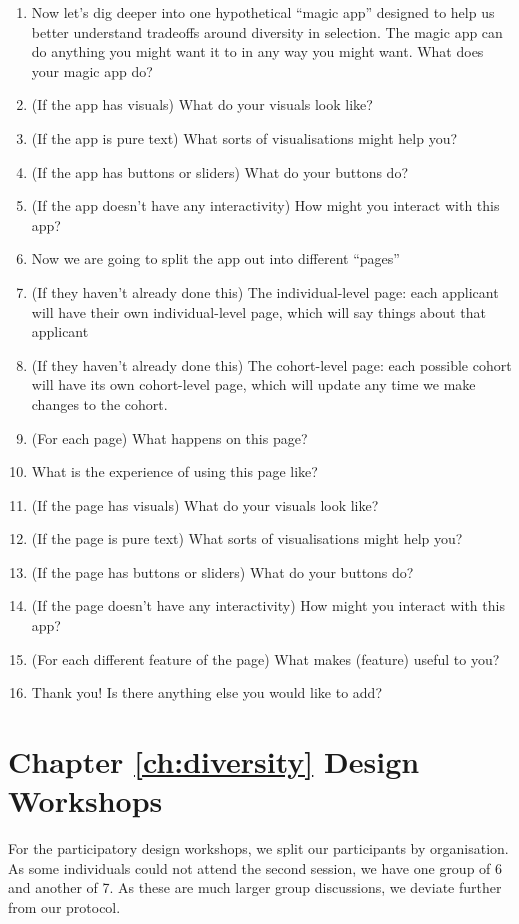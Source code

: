 \begin{enumerate}
    \item Now let's dig deeper into one hypothetical ``magic app'' designed to help us better understand tradeoffs around diversity in selection. The magic app can do anything you might want it to in any way you might want. What does your magic app do?
    \item (If the app has visuals) What do your visuals look like?
    \item (If the app is pure text) What sorts of visualisations might help you?
    \item (If the app has buttons or sliders) What do your buttons do?
    \item (If the app doesn't have any interactivity) How might you interact with this app?
    \item Now we are going to split the app out into different ``pages''
    \item (If they haven't already done this) The individual-level page: each applicant will have their own individual-level page, which will say things about that applicant
    \item (If they haven't already done this) The cohort-level page: each possible cohort will have its own cohort-level page, which will update any time we make changes to the cohort.
    \item (For each page) What happens on this page?
    \item What is the experience of using this page like?
    \item (If the page has visuals) What do your visuals look like?
    \item (If the page is pure text) What sorts of visualisations might help you?
    \item (If the page has buttons or sliders) What do your buttons do?
    \item (If the page doesn't have any interactivity) How might you interact with this app?
    \item (For each different feature of the page) What makes (feature) useful to you?
    \item Thank you! Is there anything else you would like to add?
\end{enumerate}

\section{Chapter \ref{ch:diversity} Design Workshops}\label{app:divprotocol2}
For the participatory design workshops, we split our participants by organisation. As some individuals could not attend the second session, we have one group of 6 and another of 7. As these are much larger group discussions, we deviate further from our protocol.

